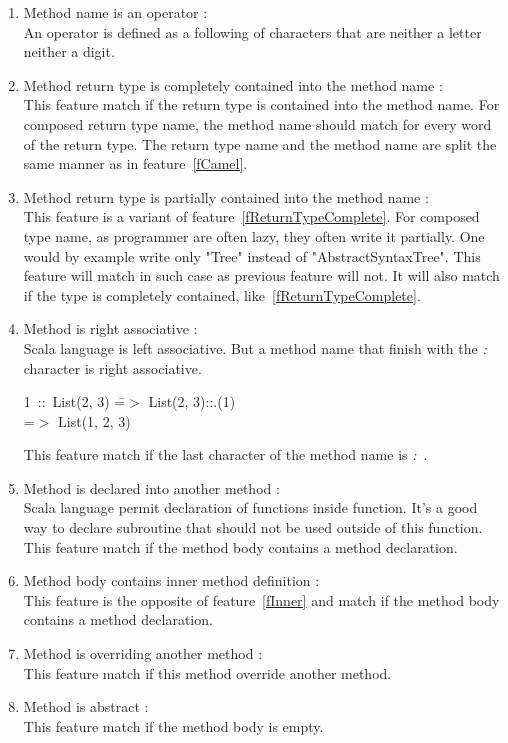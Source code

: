 \documentclass[12pt]{article}
\newcommand{\code}[1]{{\fontfamily{phv}\selectfont \small{\begin{tabbing} #1 \end{tabbing}}}}
\begin{document}
\begin{enumerate}
\item Method name is an operator :\\
	An operator is defined as a following of characters that are neither a letter neither a digit.
\item Method return type is completely contained into the method name :\label{fReturnTypeComplete}\\
	This feature match if the return type is contained into the method name. For composed return type name, the method name should match for every word of the return type. The return type name and the method name are split the same manner as in feature~\ref{fCamel}. 
\item Method return type is partially contained into the method name :\\
	This feature is a variant of feature~\ref{fReturnTypeComplete}. For composed type name, as programmer are often lazy, they often write it partially. One would by example write only "Tree" instead of "AbstractSyntaxTree". This feature will match in such case as previous feature will not. It will also match if the type is completely contained, like~\ref{fReturnTypeComplete}.
\item Method is right associative :\\
	Scala language is left associative. But a method name that finish with the \textit{:} character is right associative.
\code{
1\ ::\ List(2, 3) \==$>$ List(2, 3)::.(1)\\
\>=$>$ List(1, 2, 3)
}
This feature match if the last character of the method name is \textit{:}\ .
\item Method is declared into another method :\label{fInner}\\
	Scala language permit declaration of functions inside function. It's a good way to declare subroutine that should not be used outside of this function.\\
This feature match if the method body contains a method declaration.
\item Method body contains inner method definition :\\
	This feature is the opposite of feature~\ref{fInner} and match if the method body contains a method declaration.
\item Method is overriding another method : \\
	This feature match if this method override another method.
\item Method is abstract :\\
	This feature match if the method body is empty.

\end{enumerate}
\end{document}
